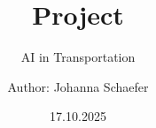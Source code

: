 



	\title{Project}
	\subtitle{AI in Transportation}
	\author{Author: Johanna Schaefer}
	\date{17.10.2025}
	\maketitle
	\vspace{3cm}
	
	\thispagestyle{empty}	%
	
	
	\thispagestyle{empty}
	
	
	
	\thispagestyle{empty}
	\cleardoublepage
	\thispagestyle{empty}
	\newpage
	
	\setcounter{page}{1}	%
	
